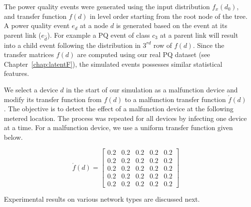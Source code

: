 The power quality events were generated using the input distribution $f_x(d_0)$, and transfer function $f(d)$ in level order starting from the root node of the tree. A power quality event $e_d$ at a node $d$ is generated based on the event at its parent link ($e_{\widehat d}$). For example a PQ event of class $c_3$ at a parent link will result into a child event following the distribution in $3^{rd}$ row of $f(d)$. Since the transfer matrices $f(d)$ are computed using our real PQ dataset (see Chapter~\ref{chap:latentF}), the simulated events possesses similar statistical features.

We select a device $d$ in the start of our simulation as a malfunction device and modify its transfer function from $f(d)$ to a malfunction transfer function $\acute f(d)$. The objective is to detect the effect of a malfunction device at the following metered location. The process was repeated for all devices by infecting one device at a time. For a malfunction device, we use a uniform transfer function given below.

\[\acute f(d) = \left[\begin{array}{ccccc}
0.2 & 0.2 & 0.2 & 0.2 & 0.2\\
0.2 & 0.2 & 0.2 & 0.2 & 0.2\\
0.2 & 0.2 & 0.2 & 0.2 & 0.2\\
0.2 & 0.2 & 0.2 & 0.2 & 0.2\\
0.2 & 0.2 & 0.2 & 0.2 & 0.2\end{array}\right]\]

\noindent Experimental results on various network types are discussed next.



